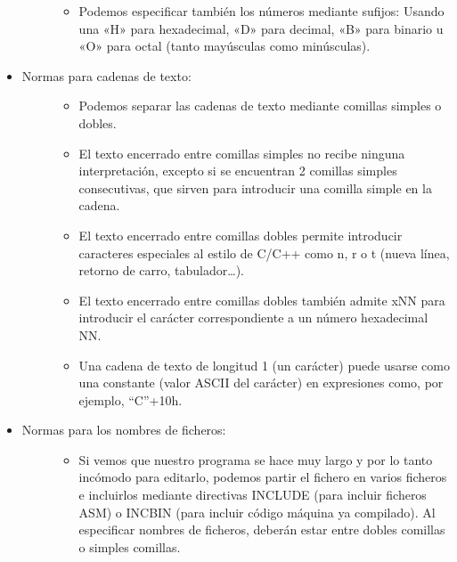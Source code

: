 \documentclass[letterpaper,10pt,spanish]{sphinxmanual}
\begin{document}
\begin{itemize}
\begin{description}
\begin{itemize}
\item {} 
Podemos especificar también los números mediante sufijos: Usando una «H» para hexadecimal, «D» para decimal, «B» para binario u «O» para octal (tanto mayúsculas como minúsculas).

\end{itemize}

\end{description}

\item {} \begin{description}
\item[{Normas para cadenas de texto:}] \leavevmode\begin{itemize}
\item {} 
Podemos separar las cadenas de texto mediante comillas simples o dobles.

\item {} 
El texto encerrado entre comillas simples no recibe ninguna interpretación, excepto si se encuentran 2 comillas simples consecutivas, que sirven para introducir una comilla simple en la cadena.

\item {} 
El texto encerrado entre comillas dobles permite introducir caracteres especiales al estilo de C/C++ como n, r o t (nueva línea, retorno de carro, tabulador…).

\item {} 
El texto encerrado entre comillas dobles también admite xNN para introducir el carácter correspondiente a un número hexadecimal NN.

\item {} 
Una cadena de texto de longitud 1 (un carácter) puede usarse como una constante (valor ASCII del carácter) en expresiones como, por ejemplo, “C”+10h.

\end{itemize}

\end{description}

\item {} \begin{description}
\item[{Normas para los nombres de ficheros:}] \leavevmode\begin{itemize}
\item {} 
Si vemos que nuestro programa se hace muy largo y por lo tanto incómodo para editarlo, podemos partir el fichero en varios ficheros e incluirlos mediante directivas INCLUDE (para incluir ficheros ASM) o INCBIN (para incluir código máquina ya compilado). Al especificar nombres de ficheros, deberán estar entre dobles comillas o simples comillas.


\end{itemize}
\end{description}
\end{itemize}
\end{document}
